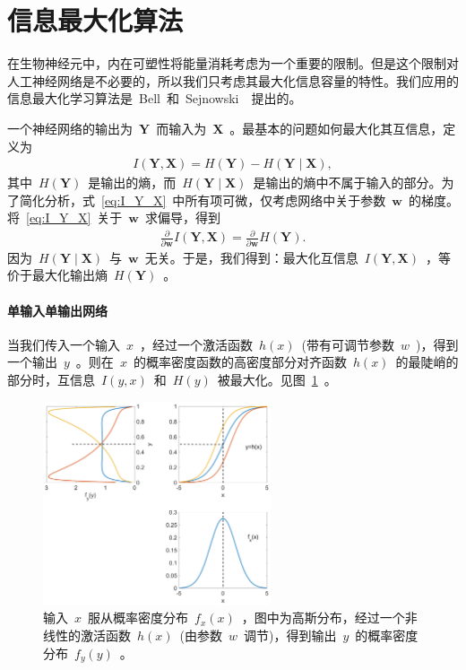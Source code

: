\documentclass[UTF8,a4paper,12pt]{ctexart}
\numberwithin{equation}{section}
\numberwithin{figure}{section}
\numberwithin{table}{section}
\renewcommand{\bold}[1]{~$\bm{#1}$~}
\begin{document}
\section{信息最大化算法} \label{section2}
在生物神经元中，内在可塑性将能量消耗考虑为一个重要的限制。但是这个限制对人工神经网络是不必要的，所以我们只考虑其最大化信息容量的特性。我们应用的信息最大化学习算法是~Bell~和~Sejnowski~\cite{bell1995information}~提出的。

一个神经网络的输出为\bold{Y}而输入为\bold{X}。最基本的问题如何最大化其互信息，定义为
\begin{align}
I(\bm{Y},\bm{X})=H(\bm{Y})-H(\bm{Y} \mid \bm{X}), \label{eq:I_Y_X}
\end{align}
其中~$H(\bm{Y})$~是输出的熵，而~$H(\bm{Y} \mid \bm{X})$~是输出的熵中不属于输入的部分。为了简化分析，式~\eqref{eq:I_Y_X}~中所有项可微，仅考虑网络中关于参数\bold{w}的梯度。将~\eqref{eq:I_Y_X}~关于\bold{w}求偏导，得到
\begin{align}
\frac{\partial}{\partial \bm{w}} I(\bm{Y},\bm{X})=\frac{\partial}{\partial \bm{w}} H(\bm{Y}).
\end{align}
因为~$H(\bm{Y} \mid \bm{X})$~与\bold{w}无关。于是，我们得到：最大化互信息~$I(\bm{Y},\bm{X})$~，等价于最大化输出熵~$H(\bm{Y})$~。

\paragraph{单输入单输出网络} 当我们传入一个输入~$x$~，经过一个激活函数~$h(x)$~(带有可调节参数~$w$~)，得到一个输出~$y$~。则在~$x$~的概率密度函数的高密度部分对齐函数~$h(x)$~的最陡峭的部分时，互信息~$I(y,x)$~和~$H(y)$~被最大化。见图~\ref{fig:maximization}~。
\begin{figure}[htbp]
	\centering
	\includegraphics[width=0.6\textwidth]{maximization.pdf}
	\caption{输入~$x$~服从概率密度分布~$f_x(x)$~，图中为高斯分布，经过一个非线性的激活函数~$h(x)$~(由参数~$w$~调节)，得到输出~$y$~的概率密度分布~$f_y(y)$~。}\label{fig:maximization}
\end{figure}
\end{document}
